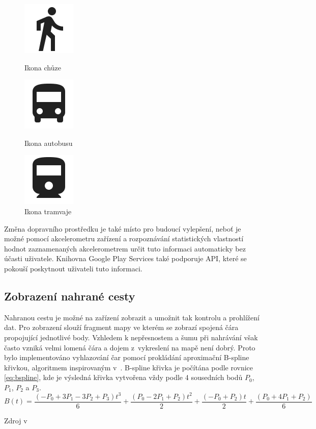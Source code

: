 \documentclass[czech,master,public,dept460,male,java,cpdeclaration]{diploma}
\begin{document}
\begin{figure}[H]
  \centering
  \includegraphics[scale=0.2]{img/ic_directions_walk_black_24dp.png}
  \caption{Ikona chůze}\label{fig:icwalk}
\endminipage\hfill
{}
  \centering
  \includegraphics[scale=0.2]{img/ic_directions_bus_black_24dp.png}
  \caption{Ikona autobusu}\label{fig:icbus}
\endminipage\hfill
{}%
  \centering
  \includegraphics[scale=0.2]{img/ic_directions_railway_black_24dp.png}
  \caption{Ikona tramvaje}\label{fig:ictram}
\endminipage
\end{figure}
Změna dopravního prostředku je také místo pro budoucí vylepšení, neboť je možné pomocí akcelerometru
zařízení a rozpoznávání statistických vlastností hodnot zaznamenaných akcelerometrem určit tuto informaci
automaticky bez účasti uživatele. Knihovna Google Play Services také podporuje API, které se pokouší
poskytnout uživateli tuto informaci.

\subsection{Zobrazení nahrané cesty}
Nahranou cestu je možné na zařízení zobrazit a umožnit tak kontrolu a prohlížení dat.
Pro zobrazení slouží fragment mapy ve kterém se zobrazí spojená čára propojující jednotlivé body.
Vzhledem k nepřesnostem a šumu při nahrávání však často vzniká velmi lomená čára a dojem z~vykreslení
na mapě není dobrý. Proto bylo implementováno vyhlazování čar pomocí prokládání aproximační
B-spline křivkou, algoritmem inspirovaným v~\cite{bspline}. B-spline křivka je počítána podle
rovnice \ref{eq:bspline}, kde je výsledná křivka vytvořena vždy podle 4 sousedních bodů $P_0$, $P_1$,
$P_2$ a $P_3$.
\begin{equation}
B(t)=\frac{(-P_0 + 3P_1 - 3P_2 + P_3)t^3}{6} + \frac{(P_0 - 2P_1 + P_2)t^2}{2} + \frac{(-P_0 + P_2)t}{2} + \frac{(P_0 + 4P_1 + P_2)}{6}
\label{eq:bspline}
\end{equation}
\centerline{Zdroj v~\cite{bspline}}
\end{document}
